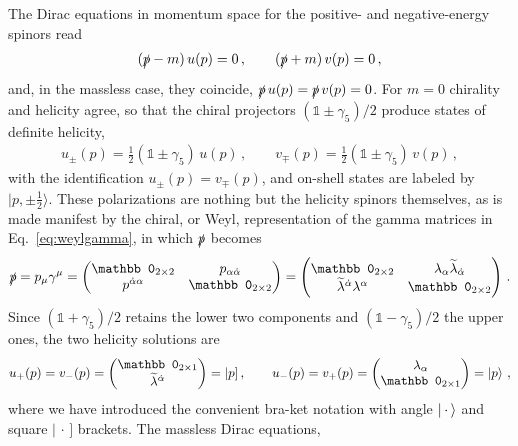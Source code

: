 The Dirac equations in momentum space for the positive- and negative-energy spinors read
\begin{align}
    (\slashed{p} - m)\,u(p)=0\,, \qquad (\slashed{p} + m)\,v(p)=0\,,
\end{align}
and, in the massless case, they coincide, $\slashed{p}\, u(p) = \slashed{p}\, v(p) = 0$. For $m=0$ chirality
and helicity agree, so that the chiral projectors $(\mathbb 1 \pm\gamma_5)/2$ produce states of
definite helicity,
\begin{align}
    u_\pm (p) = \frac{1}{2}(\mathbb 1 \pm\gamma_5)\,u(p)\,, \qquad
    v_\mp (p) = \frac{1}{2}(\mathbb 1 \pm\gamma_5)\,v(p) \,,
\end{align}
with the identification $u_\pm (p)=v_\mp (p)$, and on-shell states are labeled by
$|p,\pm \frac{1}{2}\rangle$. These polarizations are nothing but the helicity spinors themselves, as is made
manifest by the chiral, or Weyl, representation of the gamma matrices in Eq.~\eqref{eq:weylgamma},
in which $\slashed{p}$ becomes
\begin{equation}
    \sls p = p_\mu \gamma^\mu = \begin{pmatrix}
        \mathbb 0_{2\times 2} & p_{\alpha \dot\alpha} \\ p^{\dot\alpha \alpha} & \mathbb 0_{2\times 2}
    \end{pmatrix}
    =
    \begin{pmatrix}
        \mathbb 0_{2\times 2} & \lambda_\alpha \tildee\lambda_{\dot\alpha}  \\ \tildee\lambda^{\dot\alpha}\lambda^\alpha & \mathbb 0_{2\times 2}
    \end{pmatrix}\,.
\end{equation}
Since $(\mathbb 1+\gamma_5)/2$ retains the lower two components and $(\mathbb 1-\gamma_5)/2$ the
upper ones, the two helicity solutions are
\begin{equation}
    u_+(p) = v_-(p) = \begin{pmatrix}
        \mathbb 0_{2\times 1} \\ \tildee\lambda^{\dot \alpha}
    \end{pmatrix}
    =|p]  \,,\qquad
    u_-(p) = v_+(p) = \begin{pmatrix}
        \lambda_\alpha \\ \mathbb 0_{2\times 1}
    \end{pmatrix}
    = \ket{p}\,,
\end{equation}
where we have introduced the convenient bra-ket notation with angle $\ket{\,\cdot\,}$ and square
$|\, \cdot\,]$ brackets. The massless Dirac equations,
